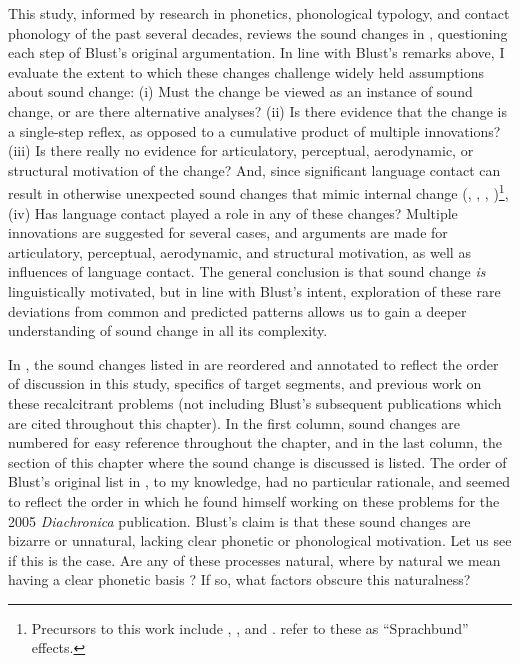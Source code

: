 \documentclass[output=paper]{langscibook}
\begin{document}
This study, informed by research in phonetics, phonological typology, and contact phonology of the past several decades, reviews the sound changes in , questioning each step of Blust’s original argumentation. In line with Blust’s remarks above, I evaluate the extent to which these changes challenge widely held assumptions about sound change: (i) Must the change be viewed as an instance of sound change, or are there alternative analyses? (ii) Is there evidence that the change is a single-step reflex, as opposed to a cumulative product of multiple innovations? (iii) Is there really no evidence for articulatory, perceptual, aerodynamic, or structural motivation of the change? And, since significant language contact can result in otherwise unexpected sound changes that mimic internal change (\citealt{Hamp1996}, \citealt{BabelEtAl2013}, \citealt{YaoChang2016}, \citealt{Blevins2017a,Blevins2017b})\footnote{Precursors to this work include \citet[213]{Sapir1921} \citet{Hock1975}, \citet{Desphande1979}, and \citet{Hamp1979}. \citet{AnderssonEtAl2017} refer to these as “Sprachbund” effects.}, (iv) Has language contact played a role in any of these changes? Multiple innovations are suggested for several cases, and arguments are made for articulatory, perceptual, aerodynamic, and structural motivation, as well as influences of language contact. The general conclusion is that sound change \textit{is} linguistically motivated, but in line with Blust’s intent, exploration of these rare deviations from common and predicted patterns allows us to gain a deeper understanding of sound change in all its complexity.

In , the sound changes listed in  are reordered and annotated to reflect the order of discussion in this study, specifics of target segments, and previous work on these recalcitrant problems (not including Blust’s subsequent publications which are cited throughout this chapter). In the first column, sound changes are numbered for easy reference throughout the chapter, and in the last column, the section of this chapter where the sound change is discussed is listed. The order of Blust’s original list in , to my knowledge, had no particular rationale, and seemed to reflect the order in which he found himself working on these problems for the 2005 \textit{Diachronica} publication. Blust’s claim is that these sound changes are bizarre or unnatural, lacking clear phonetic or phonological motivation. Let us see if this is the case. Are any of these processes natural, where by natural we mean having a clear phonetic basis \citep{Blevins2008b}? If so, what factors obscure this naturalness?
\end{document}
